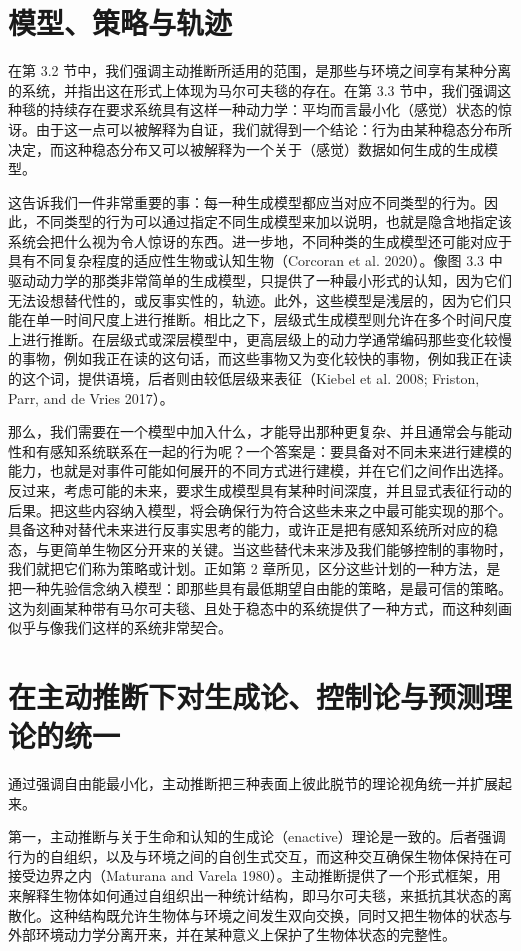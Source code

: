 \section{模型、策略与轨迹}

在第 3.2 节中，我们强调主动推断所适用的范围，是那些与环境之间享有某种分离的系统，并指出这在形式上体现为马尔可夫毯的存在。在第 3.3 节中，我们强调这种毯的持续存在要求系统具有这样一种动力学：平均而言最小化（感觉）状态的惊讶。由于这一点可以被解释为自证，我们就得到一个结论：行为由某种稳态分布所决定，而这种稳态分布又可以被解释为一个关于（感觉）数据如何生成的生成模型。

这告诉我们一件非常重要的事：每一种生成模型都应当对应不同类型的行为。因此，不同类型的行为可以通过指定不同生成模型来加以说明，也就是隐含地指定该系统会把什么视为令人惊讶的东西。进一步地，不同种类的生成模型还可能对应于具有不同复杂程度的适应性生物或认知生物（Corcoran et al. 2020）。像图 3.3 中驱动动力学的那类非常简单的生成模型，只提供了一种最小形式的认知，因为它们无法设想替代性的，或反事实性的，轨迹。此外，这些模型是浅层的，因为它们只能在单一时间尺度上进行推断。相比之下，层级式生成模型则允许在多个时间尺度上进行推断。在层级式或深层模型中，更高层级上的动力学通常编码那些变化较慢的事物，例如我正在读的这句话，而这些事物又为变化较快的事物，例如我正在读的这个词，提供语境，后者则由较低层级来表征（Kiebel et al. 2008; Friston, Parr, and de Vries 2017）。

那么，我们需要在一个模型中加入什么，才能导出那种更复杂、并且通常会与能动性和有感知系统联系在一起的行为呢？一个答案是：要具备对不同未来进行建模的能力，也就是对事件可能如何展开的不同方式进行建模，并在它们之间作出选择。反过来，考虑可能的未来，要求生成模型具有某种时间深度，并且显式表征行动的后果。把这些内容纳入模型，将会确保行为符合这些未来之中最可能实现的那个。具备这种对替代未来进行反事实思考的能力，或许正是把有感知系统所对应的稳态，与更简单生物区分开来的关键。当这些替代未来涉及我们能够控制的事物时，我们就把它们称为策略或计划。正如第 2 章所见，区分这些计划的一种方法，是把一种先验信念纳入模型：即那些具有最低期望自由能的策略，是最可信的策略。这为刻画某种带有马尔可夫毯、且处于稳态中的系统提供了一种方式，而这种刻画似乎与像我们这样的系统非常契合。

\section{在主动推断下对生成论、控制论与预测理论的统一}

通过强调自由能最小化，主动推断把三种表面上彼此脱节的理论视角统一并扩展起来。

第一，主动推断与关于生命和认知的生成论（enactive）理论是一致的。后者强调行为的自组织，以及与环境之间的自创生式交互，而这种交互确保生物体保持在可接受边界之内（Maturana and Varela 1980）。主动推断提供了一个形式框架，用来解释生物体如何通过自组织出一种统计结构，即马尔可夫毯，来抵抗其状态的离散化。这种结构既允许生物体与环境之间发生双向交换，同时又把生物体的状态与外部环境动力学分离开来，并在某种意义上保护了生物体状态的完整性。

